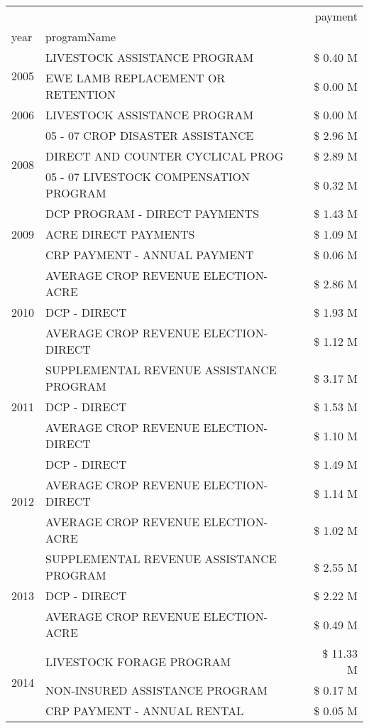 \begin{tabular}{llr}
\toprule
 &  & payment \\
year & programName &  \\
\midrule
\multirow[t]{2}{*}{2005} & LIVESTOCK ASSISTANCE PROGRAM & \$ 0.40 M \\
 & EWE LAMB REPLACEMENT OR RETENTION & \$ 0.00 M \\
\cline{1-3}
2006 & LIVESTOCK ASSISTANCE PROGRAM & \$ 0.00 M \\
\cline{1-3}
\multirow[t]{3}{*}{2008} & 05 - 07 CROP DISASTER ASSISTANCE & \$ 2.96 M \\
 & DIRECT AND COUNTER CYCLICAL PROG & \$ 2.89 M \\
 & 05 - 07 LIVESTOCK COMPENSATION PROGRAM & \$ 0.32 M \\
\cline{1-3}
\multirow[t]{3}{*}{2009} & DCP PROGRAM - DIRECT PAYMENTS & \$ 1.43 M \\
 & ACRE DIRECT PAYMENTS & \$ 1.09 M \\
 & CRP PAYMENT - ANNUAL PAYMENT & \$ 0.06 M \\
\cline{1-3}
\multirow[t]{3}{*}{2010} & AVERAGE CROP REVENUE ELECTION-ACRE & \$ 2.86 M \\
 & DCP - DIRECT & \$ 1.93 M \\
 & AVERAGE CROP REVENUE ELECTION-DIRECT & \$ 1.12 M \\
\cline{1-3}
\multirow[t]{3}{*}{2011} & SUPPLEMENTAL REVENUE ASSISTANCE PROGRAM & \$ 3.17 M \\
 & DCP - DIRECT & \$ 1.53 M \\
 & AVERAGE CROP REVENUE ELECTION-DIRECT & \$ 1.10 M \\
\cline{1-3}
\multirow[t]{3}{*}{2012} & DCP - DIRECT & \$ 1.49 M \\
 & AVERAGE CROP REVENUE ELECTION-DIRECT & \$ 1.14 M \\
 & AVERAGE CROP REVENUE ELECTION-ACRE & \$ 1.02 M \\
\cline{1-3}
\multirow[t]{3}{*}{2013} & SUPPLEMENTAL REVENUE ASSISTANCE PROGRAM & \$ 2.55 M \\
 & DCP - DIRECT & \$ 2.22 M \\
 & AVERAGE CROP REVENUE ELECTION-ACRE & \$ 0.49 M \\
\cline{1-3}
\multirow[t]{3}{*}{2014} & LIVESTOCK FORAGE PROGRAM & \$ 11.33 M \\
 & NON-INSURED ASSISTANCE PROGRAM & \$ 0.17 M \\
 & CRP PAYMENT - ANNUAL RENTAL & \$ 0.05 M \\
\cline{1-3}

\end{tabular}
